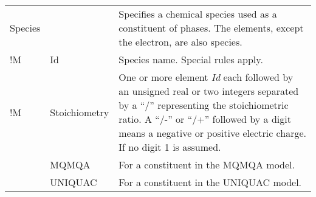 \documentclass[10pt]{article}
\begin{document}
\begin{table}[!h]
\begin{tabular}{|p{} p{} p{}|}
  Species & & Specifies a chemical species used as a constituent of phases.  
                        The elements, except the electron, are also species.\\
!M          & Id        & Species name. Special rules apply. \\
!M          & Stoichiometry & One or more element {\em Id} each followed by 
                        an unsigned real or two integers separated by a ``/'' 
                        representing the stoichiometric ratio.
                        A ``/-'' or ``/+'' followed by a digit means a negative
                      or positive electric charge.  If no digit 1 is assumed.\\
                      & MQMQA     & For a constituent in the MQMQA model.\\
                  & UNIQUAC   & For a constituent in the UNIQUAC model.\\\hline

\end{tabular}
\end{table}


\end{document}
